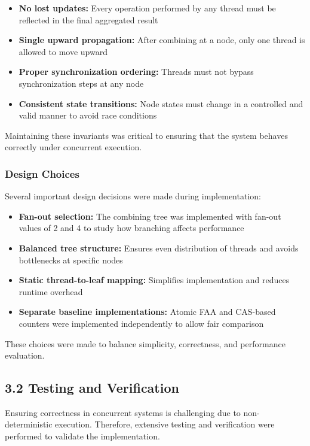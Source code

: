 \documentclass[11pt,a4paper]{article}
\begin{document}
\begin{itemize}
    \item \textbf{No lost updates:} Every operation performed by any thread must be reflected in the final aggregated result
    \item \textbf{Single upward propagation:} After combining at a node, only one thread is allowed to move upward
    \item \textbf{Proper synchronization ordering:} Threads must not bypass synchronization steps at any node
    \item \textbf{Consistent state transitions:} Node states must change in a controlled and valid manner to avoid race conditions
\end{itemize}
Maintaining these invariants was critical to ensuring that the system behaves correctly under concurrent execution.

\subsubsection*{Design Choices}

Several important design decisions were made during implementation:

\begin{itemize}
    \item \textbf{Fan-out selection:} The combining tree was implemented with fan-out values of 2 and 4 to study how branching affects performance
    \item \textbf{Balanced tree structure:} Ensures even distribution of threads and avoids bottlenecks at specific nodes
    \item \textbf{Static thread-to-leaf mapping:} Simplifies implementation and reduces runtime overhead
    \item \textbf{Separate baseline implementations:} Atomic FAA and CAS-based counters were implemented independently to allow fair comparison
\end{itemize}
These choices were made to balance simplicity, correctness, and performance evaluation.

\subsection*{3.2 Testing and Verification}

Ensuring correctness in concurrent systems is challenging due to non-deterministic execution. Therefore, extensive testing and verification were performed to validate the implementation.
\end{document}
